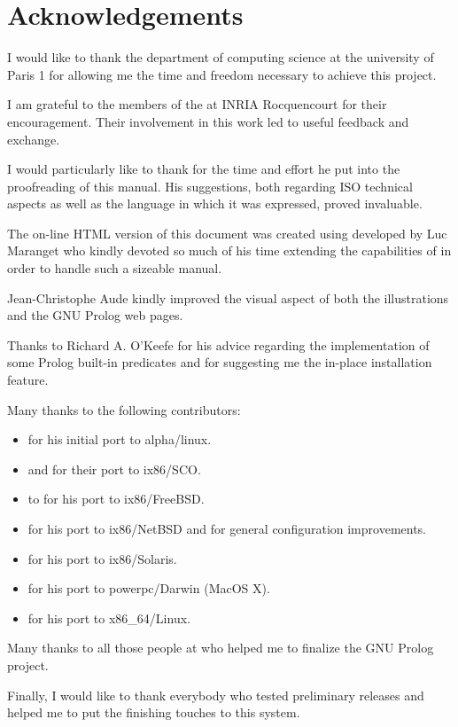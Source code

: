 \newpage
\section{Acknowledgements}

I would like to thank the 
{department of computing science} at the university of Paris 1 for allowing
me the time and freedom necessary to achieve this project.

I am grateful to the members of the  at 
{INRIA Rocquencourt} for their encouragement. Their involvement in this work
led to useful feedback and exchange.

I would particularly like to thank
 for the time and
effort he put into the proofreading of this manual. His suggestions, both
regarding ISO technical aspects as well as the language in which it was
expressed, proved invaluable.

The on-line HTML version of this document was created using
 developed by Luc Maranget who kindly devoted so much
of his time extending the capabilities of {\hevea} in order to handle such a
sizeable manual.

Jean-Christophe Aude kindly improved the visual aspect of both the
illustrations and the GNU Prolog web pages.

Thanks to Richard A. O'Keefe for his advice regarding the implementation of
some Prolog built-in predicates and for suggesting me the in-place
installation feature.

Many thanks to the following contributors:

\begin{itemize}

\item {} for his initial port to
alpha/linux.

\item {} and
 for their port to 
ix86/SCO.

\item {} to for his port to
ix86/FreeBSD.

\item {} for his port to
ix86/NetBSD and for general configuration improvements.

\item {} for
his port to ix86/Solaris.

\item {} for his port to 
powerpc/Darwin (MacOS X).

\item {} for his port to
x86\_64/Linux.

\end{itemize}

Many thanks to all those people at  who helped
me to finalize the GNU Prolog project.

Finally, I would like to thank everybody who tested preliminary releases and
helped me to put the finishing touches to this system.
